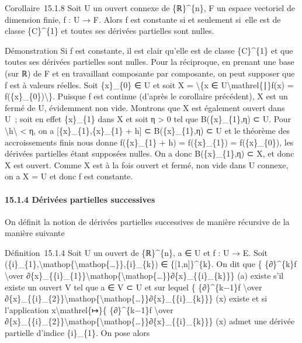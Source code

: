 Corollaire~15.1.8 Soit U un ouvert connexe de \{ℝ\}\^{}\{n\}, F un
espace vectoriel de dimension finie, f : U → F. Alors f est constante si
et seulement si~elle est de classe \{C\}\^{}\{1\} et toutes ses dérivées
partielles sont nulles.

Démonstration Si f est constante, il est clair qu'elle est de classe
\{C\}\^{}\{1\} et que toutes ses dérivées partielles sont nulles. Pour
la réciproque, en prenant une base (sur ℝ) de F et en travaillant
composante par composante, on peut supposer que f est à valeurs réelles.
Soit \{x\}\_\{0\} ∈ U et soit X = \textbackslash{}\{x ∈
U\textbackslash{}mathrel\{∣\}f(x) = f(\{x\}\_\{0\})\textbackslash{}\}.
Puisque f est continue (d'après le corollaire précédent), X est un fermé
de U, évidemment non vide. Montrons que X est également ouvert dans U~;
soit en effet \{x\}\_\{1\} dans X et soit η \textgreater{} 0 tel que
B(\{x\}\_\{1\},η) ⊂ U. Pour
\textbackslash{}\textbar{}h\textbackslash{}\textbar{} \textless{} η, on
a {[}\{x\}\_\{1\},\{x\}\_\{1\} + h{]} ⊂ B(\{x\}\_\{1\},η) ⊂ U et le
théorème des accroissements finis nous donne f(\{x\}\_\{1\} + h) =
f(\{x\}\_\{1\}) = f(\{x\}\_\{0\}), les dérivées partielles étant
supposées nulles. On a donc B(\{x\}\_\{1\},η) ⊂ X, et donc X est ouvert.
Comme X est à la fois ouvert et fermé, non vide dans U connexe, on a X =
U et donc f est constante.

\paragraph{15.1.4 Dérivées partielles successives}

On définit la notion de dérivées partielles successives de manière
récursive de la manière suivante

Définition~15.1.4 Soit U un ouvert de \{ℝ\}\^{}\{n\}, a ∈ U et f : U →
E. Soit
(\{i\}\_\{1\},\textbackslash{}mathop\{\textbackslash{}mathop\{\ldots{}\}\},\{i\}\_\{k\})
∈ \{{[}1,n{]}\}\^{}\{k\}. On dit que \{ \{∂\}\^{}\{k\}f
\textbackslash{}over
∂\{x\}\_\{\{i\}\_\{1\}\}\textbackslash{}mathop\{\textbackslash{}mathop\{\ldots{}\}\}∂\{x\}\_\{\{i\}\_\{k\}\}\}
(a) existe s'il existe un ouvert V tel que a ∈ V ⊂ U et sur lequel \{
\{∂\}\^{}\{k−1\}f \textbackslash{}over
∂\{x\}\_\{\{i\}\_\{2\}\}\textbackslash{}mathop\{\textbackslash{}mathop\{\ldots{}\}\}∂\{x\}\_\{\{i\}\_\{k\}\}\}
(x) existe et si l'application x\textbackslash{}mathrel\{↦\}\{
\{∂\}\^{}\{k−1\}f \textbackslash{}over
∂\{x\}\_\{\{i\}\_\{2\}\}\textbackslash{}mathop\{\textbackslash{}mathop\{\ldots{}\}\}∂\{x\}\_\{\{i\}\_\{k\}\}\}
(x) admet une dérivée partielle d'indice \{i\}\_\{1\}. On pose alors

